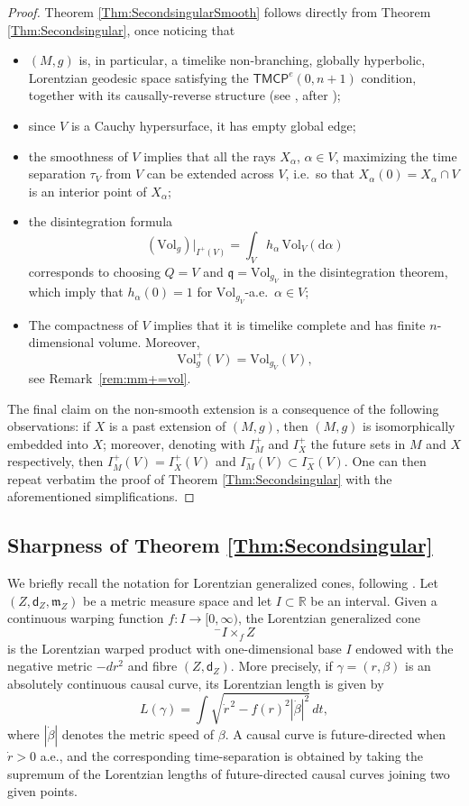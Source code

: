 \documentclass[a4paper,10pt]{article}
\newcommand{\di}{\mathrm{d}}
\newcommand{\vol}{\mathrm{Vol}}
\newcommand{\mm}{\mathfrak m}
\newcommand{\qq}{\mathfrak q}
\newcommand{\sfd}{\mathsf d}
\theoremstyle{plain}
\theoremstyle{definition}
\numberwithin{equation}{section}
\begin{document}
\begin{proof}
Theorem \ref{Thm:SecondsingularSmooth} follows directly from Theorem \ref{Thm:Secondsingular}, once noticing that
\begin{itemize}
\item $(M,g)$ is, in particular, a timelike non-branching, globally hyperbolic, Lorentzian geodesic space satisfying the $\mathsf{TMCP}^{e}(0,n+1)$ condition, together with its causally-reverse structure (see \cite[Theorem A.1]{CaMo:20}, after \cite{McCann, MoSu});

\item since $V$ is a Cauchy hypersurface, it has empty global edge;

\item the smoothness of $V$ implies that all the rays $X_\alpha$, $\alpha\in V$, maximizing the time separation $\tau_V$ from $V$ can be extended across $V$, i.e.\ so that  $X_\alpha(0)=X_\alpha\cap V$ is an interior point of $X_\alpha$;

\item  the disintegration formula $$(\vol_g)|_{I^+(V)}=\int_V h_\alpha\, \vol_V(\di\alpha)$$ corresponds to choosing  $Q=V$ and $\qq=\vol_{g_V}$ in the disintegration theorem, which imply that $h_\alpha(0)=1$ for $\vol_{g_V}$-a.e.\ $\alpha\in V$;

\item The compactness of \( V \) implies that it is timelike complete and has finite \( n \)-dimensional volume. Moreover,
\[
\vol_g^+(V)=\vol_{g_V}(V),
\]
see Remark~\ref{rem:mm+=vol}.
\end{itemize}
The final claim on the non-smooth extension is a consequence of the following observations: if $X$ is a past extension of $(M,g)$, then $(M,g)$ is isomorphically embedded into $X$; moreover, denoting with $I^+_M$ and $I^+_X$ the future sets in $M$ and $X$ respectively, then  $I_M^+(V)=I^+_X(V)$ and $I_M^-(V)\subset I^-_X(V)$. One can then repeat verbatim the proof of Theorem \ref{Thm:Secondsingular} with the aforementioned simplifications.
\end{proof}


\subsection{Sharpness of Theorem \ref{Thm:Secondsingular}}


We briefly recall the notation for Lorentzian generalized cones, following
\cite{CalistiKettererSaemann}. Let $(Z,\sfd_Z,\mm_Z)$ be a metric measure
space and let $I\subset\mathbb R$ be an interval. Given a continuous
warping function $f:I\to[0,\infty)$, the Lorentzian generalized cone
\[
    {}^{-}I\times_f Z
\]
is the Lorentzian warped product with one-dimensional base $I$ endowed
with the negative metric $-dr^2$ and fibre $(Z,\sfd_Z)$. More precisely,
if $\gamma=(r,\beta)$ is an absolutely continuous causal curve, its
Lorentzian length is given by
\[
    L(\gamma)
    =
    \int
    \sqrt{\dot r^{\,2}-f(r)^2|\dot\beta|^2}\,dt,
\]
where $|\dot\beta|$ denotes the metric speed of $\beta$. A causal curve
is future-directed when $\dot r>0$ a.e., and the corresponding
time-separation is obtained by taking the supremum of the Lorentzian
lengths of future-directed causal curves joining two given points.
\end{document}
